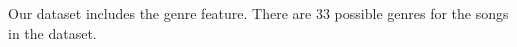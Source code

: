 \documentclass[../report.tex]{subfiles}
\begin{document}
Our dataset includes the genre feature. There are $33$ possible genres for the songs in the dataset.


















\end{document}
